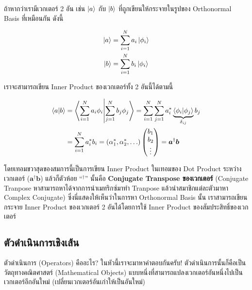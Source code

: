 ถ้าหากว่าเรามีเวกเตอร์ 2 อัน เช่น $\ket{a}$ กับ $\ket{b}$ ที่ถูกเขียนให้กระจายในรูปของ Orthonormal Basis ที่เหมือนกัน ดังนี้

\begin{equation}
    \begin{split}
        \ket{a} &= \sum_{i = 1}^N a_i \ket{\phi_i} \\
        \ket{b} &= \sum_{i = 1}^N b_i \ket{\phi_i}
    \end{split}
\end{equation}

\noindent เราจะสามารถเขียน Inner Product ของเวกเตอร์ทั้ง 2 อันนี้ได้ตามนี้

\begin{equation}
    \begin{split}
        \braket{a}{b} &= \braket{\sum_{i = 1}^N a_i \phi_i}{\sum_{j = 1}^N b_j \phi_j }
        = \sum_{i = 1}^N  \sum_{j = 1}^N a_i^*  \underbrace{\braket{\phi_i}{\phi_j}}_{\delta_{ij}} b_j \\
        &= \sum_{i = 1}^N a_i^* b_i = (\alpha^*_1, \alpha^*_2,\ldots)
        \begin{pmatrix}
            b_1 \\
            b_2 \\
            \vdots
        \end{pmatrix} =
        \bm{a}^\dagger\bm{b}
    \end{split}
\end{equation}

\noindent โดยเทอมขวาสุดของสมการนี้เป็นการเขียน Inner Product ในเทอมของ Dot Product ระหว่างเวกเตอร์ ($\bm{a}^\dagger
    \bm{b}$) แล้วก็ตัวห้อย ``${}^\dagger$'' นั้นคือ \textbf{Conjugate Transpose ของเวกเตอร์} (Conjugate Tranpose
หาสามารถหาได้จากการนำเมทริกซ์มาทำ Tranpose แล้วนำสมาชิกแต่ละตัวมาหา Complex Conjugate) ซึ่งนี่แสดงให้เห็นว่าในการหา Orthonormal
Basis นั้น เราสามารถเขียนกระจาย Inner Product ของเวกเตอร์ 2 อันได้โดยการใช้ Inner Product ของสัมประสิทธิ์ของเวกเตอร์

\subsection{ตัวดำเนินการเชิงเส้น}

ตัวดำเนินการ (Operators) คืออะไร? ในหัวนี้เราจะมาหาคำตอบกันครับ! ตัวดำเนินการนั้นก็คือเป็นวัตถุทางคณิตศาสตร์ (Mathematical Objects)
แบบหนึ่งที่สามารถแปลงเวกเตอร์อันหนึ่งไปเป็นเวกเตอร์อีกอันใหม่ (เปลี่ยนเวกเตอร์อันเก่าให้เป็นอันใหม่)

